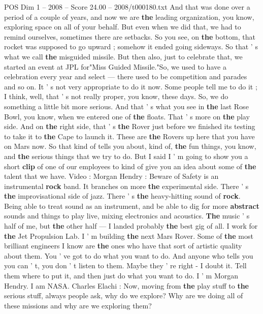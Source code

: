 \begin{textsample}{POS Dim 1 – 2008 – Score 24.00 – 2008/t000180.txt}
And that was done over a period of a couple of years, and now we are \textbf{the} leading organization, you know, exploring space on all of your behalf.
But even when we did that, we had to remind ourselves, sometimes there are setbacks.
So you see, on \textbf{the} bottom, that rocket was supposed to go upward ; somehow it ended going sideways.
So that ' s what we call \textbf{the} misguided missile.
But then also, just to celebrate that, we started an event at JPL for"Miss Guided Missile."So, we used to have a celebration every year and select — there used to be competition and parades and so on.
It ' s not very appropriate to do it now.
Some people tell me to do it ; I think, well, that ' s not really proper, you know, these days.
So, we do something a little bit more serious.
And that ' s what you see in \textbf{the} last Rose Bowl, you know, when we entered one of \textbf{the} floats.
That ' s more on \textbf{the} play side.
And on \textbf{the} right side, that ' s \textbf{the} Rover just before we finished its testing to take it to \textbf{the} Cape to launch it.
These are \textbf{the} Rovers up here that you have on Mars now.
So that kind of tells you about, kind of, \textbf{the} fun things, you know, and \textbf{the} serious things that we try to do.
But I said I ' m going to show you a short \textbf{clip} of one of our employees to kind of give you an idea about some of \textbf{the} talent that we have.
Video : Morgan Hendry : Beware of Safety is an instrumental \textbf{rock} band.
It branches on more \textbf{the} experimental side.
There ' s \textbf{the} improvisational side of jazz.
There ' s \textbf{the} heavy-hitting sound of \textbf{rock}.
Being able to treat sound as an instrument, and be able to dig for more \textbf{abstract} sounds and things to play live, mixing electronics and acoustics. \textbf{The} music ' s half of me, but \textbf{the} other half — I landed probably \textbf{the} best gig of all.
I work for \textbf{the} Jet Propulsion Lab.
I ' m building \textbf{the} next Mars Rover.
Some of \textbf{the} most brilliant engineers I know are \textbf{the} ones who have that sort of artistic quality about them.
You ' ve got to do what you want to do.
And anyone who tells you you can ' t, you don ' t listen to them.
Maybe they ' re right - I doubt it.
Tell them where to put it, and then just do what you want to do.
I ' m Morgan Hendry.
I am NASA.
Charles Elachi : Now, moving from \textbf{the} play stuff to \textbf{the} serious stuff, always people ask, why do we explore?
Why are we doing all of these missions and why are we exploring them?

\end{textsample}
